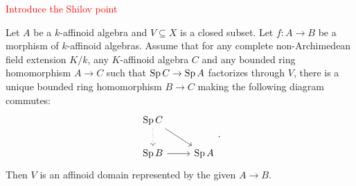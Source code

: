 \textcolor{red}{Introduce the Shilov point}

\begin{proposition}\label{prop-univpropertytemkinandberkovichequivalent}
    Let $A$ be a $k$-affinoid algebra and $V\subseteq X$ is a closed subset. Let $f:A\rightarrow B$ be a morphism of $k$-affinoid algebras.
    Assume that for any complete non-Archimedean field extension $K/k$, any $K$-affinoid algebra $C$ and any bounded ring homomorphism $A\rightarrow C$ such that $\operatorname{Sp} C\rightarrow \operatorname{Sp} A$ factorizes through $V$, there is a unique bounded ring homomorphism $B\rightarrow C$ making the following diagram commutes:
    \[
    \begin{tikzcd}
        \Sp C \arrow[rd] \arrow[d, dotted] &       \\
        \Sp B \arrow[r]                    & \Sp A
    \end{tikzcd}.
    \]
    Then $V$ is an affinoid domain represented by the given $A\rightarrow B$.
\end{proposition}
